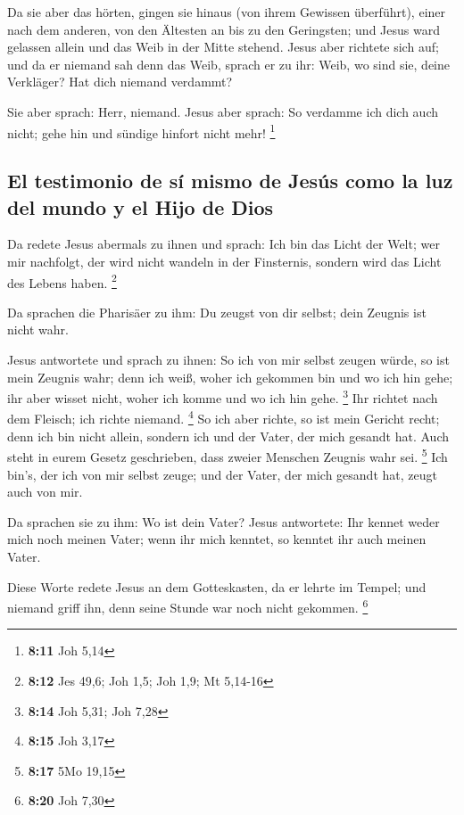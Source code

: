  Da sie aber das hörten, gingen sie hinaus (von ihrem
Gewissen überführt), einer nach dem anderen, von den Ältesten an bis zu
den Geringsten; und Jesus ward gelassen allein und das Weib in der Mitte
stehend.  Jesus aber richtete sich auf; und da er niemand
sah denn das Weib, sprach er zu ihr: Weib, wo sind sie, deine Verkläger?
Hat dich niemand verdammt?

 Sie aber sprach: Herr, niemand. Jesus aber sprach: So
verdamme ich dich auch nicht; gehe hin und sündige hinfort nicht mehr!
\footnote{\textbf{8:11} Joh 5,14}

\hypertarget{el-testimonio-de-suxed-mismo-de-jesuxfas-como-la-luz-del-mundo-y-el-hijo-de-dios}{%
\subsection{El testimonio de sí mismo de Jesús como la luz del mundo y
el Hijo de
Dios}\label{el-testimonio-de-suxed-mismo-de-jesuxfas-como-la-luz-del-mundo-y-el-hijo-de-dios}}

 Da redete Jesus abermals zu ihnen und sprach: Ich bin
das Licht der Welt; wer mir nachfolgt, der wird nicht wandeln in der
Finsternis, sondern wird das Licht des Lebens haben. \footnote{\textbf{8:12}
  Jes 49,6; Joh 1,5; Joh 1,9; Mt 5,14-16}

 Da sprachen die Pharisäer zu ihm: Du zeugst von dir
selbst; dein Zeugnis ist nicht wahr.

 Jesus antwortete und sprach zu ihnen: So ich von mir
selbst zeugen würde, so ist mein Zeugnis wahr; denn ich weiß, woher ich
gekommen bin und wo ich hin gehe; ihr aber wisset nicht, woher ich komme
und wo ich hin gehe. \footnote{\textbf{8:14} Joh 5,31; Joh 7,28}
 Ihr richtet nach dem Fleisch; ich richte niemand.
\footnote{\textbf{8:15} Joh 3,17}  So ich aber richte, so
ist mein Gericht recht; denn ich bin nicht allein, sondern ich und der
Vater, der mich gesandt hat.  Auch steht in eurem Gesetz
geschrieben, dass zweier Menschen Zeugnis wahr sei. \footnote{\textbf{8:17}
  5Mo 19,15}  Ich bin's, der ich von mir selbst zeuge;
und der Vater, der mich gesandt hat, zeugt auch von mir.

 Da sprachen sie zu ihm: Wo ist dein Vater? Jesus
antwortete: Ihr kennet weder mich noch meinen Vater; wenn ihr mich
kenntet, so kenntet ihr auch meinen Vater.

 Diese Worte redete Jesus an dem Gotteskasten, da er
lehrte im Tempel; und niemand griff ihn, denn seine Stunde war noch
nicht gekommen. \footnote{\textbf{8:20} Joh 7,30}

